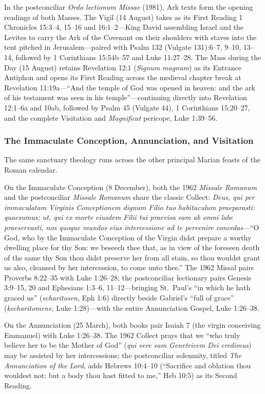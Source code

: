 In the postconciliar \textit{Ordo lectionum Missae} (1981), Ark texts form the opening readings of both Masses. The Vigil (14 August) takes as its First Reading 1 Chronicles 15:3--4, 15--16 and 16:1--2---King David assembling Israel and the Levites to carry the Ark of the Covenant on their shoulders with staves into the tent pitched in Jerusalem---paired with Psalm 132 (Vulgate 131):6--7, 9--10, 13--14, followed by 1 Corinthians 15:54b--57 and Luke 11:27--28. The Mass during the Day (15 August) retains Revelation 12:1 (\textit{Signum magnum}) as its Entrance Antiphon and opens its First Reading across the medieval chapter break at Revelation 11:19a---``And the temple of God was opened in heaven: and the ark of his testament was seen in his temple''---continuing directly into Revelation 12:1--6a and 10ab, followed by Psalm 45 (Vulgate 44), 1 Corinthians 15:20--27, and the complete Visitation and \textit{Magnificat} pericope, Luke 1:39--56.

\subsubsection{The Immaculate Conception, Annunciation, and Visitation}

The same sanctuary theology runs across the other principal Marian feasts of the Roman calendar.

On the Immaculate Conception (8 December), both the 1962 \textit{Missale Romanum} and the postconciliar \textit{Missale Romanum} share the classic Collect: \textit{Deus, qui per immaculatam Virginis Conceptionem dignum Filio tuo habitaculum praeparasti: quaesumus; ut, qui ex morte eiusdem Filii tui praevisa eam ab omni labe praeservasti, nos quoque mundos eius intercessione ad te pervenire concedas}---``O God, who by the Immaculate Conception of the Virgin didst prepare a worthy dwelling place for thy Son: we beseech thee that, as in view of the foreseen death of the same thy Son thou didst preserve her from all stain, so thou wouldst grant us also, cleansed by her intercession, to come unto thee.'' The 1962 Missal pairs Proverbs 8:22--35 with Luke 1:26--28; the postconciliar lectionary pairs Genesis 3:9--15, 20 and Ephesians 1:3--6, 11--12---bringing St.\ Paul's ``in which he hath graced us'' (\textit{echaritosen}, Eph 1:6) directly beside Gabriel's ``full of grace'' (\textit{kecharitomene}, Luke 1:28)---with the entire Annunciation Gospel, Luke 1:26--38.

On the Annunciation (25 March), both books pair Isaiah 7 (the virgin conceiving Emmanuel) with Luke 1:26--38. The 1962 Collect prays that we ``who truly believe her to be the Mother of God'' (\textit{qui vere eam Genetricem Dei credimus}) may be assisted by her intercessions; the postconciliar solemnity, titled \textit{The Annunciation of the Lord}, adds Hebrews 10:4--10 (``Sacrifice and oblation thou wouldest not: but a body thou hast fitted to me,'' Heb 10:5) as its Second Reading.

